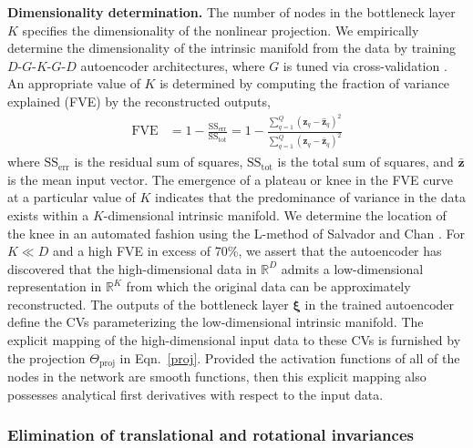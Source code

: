 \documentclass[12pt]{article}
\newcommand*{\blauw}[1]{#1}
\newcommand*{\groen}[1]{#1}
\begin{document}
\textbf{Dimensionality determination.} The number of nodes in the bottleneck layer $K$ specifies the dimensionality of the nonlinear projection. We empirically determine the dimensionality of the intrinsic manifold from the data by training $D$-$G$-$K$-$G$-$D$ autoencoder architectures, where $G$ is tuned via cross-validation \cite{friedman2001elements}. An appropriate value of $K$ is determined by computing the fraction of variance explained (\groen{FVE}) by the reconstructed outputs,
\begin{align}\label{FVE}
\mathrm{FVE} &= 1 - \frac{\mathrm{SS_{err}}}{\mathrm{SS_{tot}}} = 1 - \frac{\sum_{q=1}^Q \left(\mathbf{z}_q - \hat{\mathbf{z}}_q \right)^2}{\sum_{q=1}^Q \left(\mathbf{z}_q - \bar{\mathbf{z}}_q \right)^2}
\end{align}
where $\mathrm{SS_{err}}$ is the residual sum of squares, $\mathrm{SS_{tot}}$ is the total sum of squares, and $\bar{\mathbf{z}}$ is the mean input vector. The emergence of a plateau or knee in the FVE curve at a particular value of $K$ indicates that the predominance of variance in the data exists within a $K$-dimensional intrinsic manifold. We determine the location of the knee in an automated fashion using the L-method of Salvador and Chan \cite{salvador2004determining}. For $K \ll D$ and a high FVE in excess of 70\%, we assert that the autoencoder has discovered that the high-dimensional data in $\mathbb{R}^D$ admits a low-dimensional representation in $\mathbb{R}^K$ from which the original data can be approximately reconstructed. The outputs of the bottleneck layer $\boldsymbol\xi$ in the trained autoencoder define the CVs parameterizing the low-dimensional intrinsic manifold. The explicit mapping of the high-dimensional input data to these CVs is furnished by the projection $\Theta_\mathrm{proj}$ in \blauw{Eqn.~\ref{proj}}. Provided the activation functions of all of the nodes in the network are smooth functions, then this explicit mapping also possesses analytical first derivatives with respect to the input data.



\subsubsection{\sffamily \normalsize Elimination of translational and rotational invariances} \label{dataAug}
\end{document}
